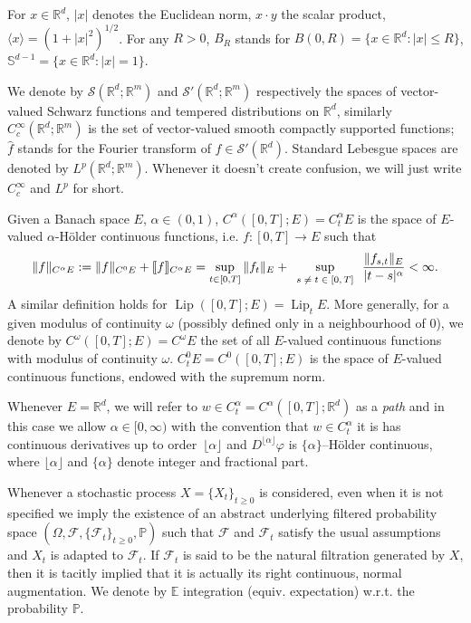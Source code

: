 \documentclass[10pt]{article}
\newcommand{\assign}{:=}
\newcommand{\tmem}[1]{{\em #1\/}}
\newcommand{\tmop}[1]{\ensuremath{\operatorname{#1}}}
\newcommand{\tmscript}[1]{\text{\scriptsize{$#1$}}}
\begin{document}
For $x \in \mathbb{R}^d$, $|x|$ denotes the Euclidean norm, $x \cdot y$ the
scalar product, $\langle x \rangle = (1 + |x|^2)^{1 / 2}$. For any $R > 0$,
$B_R$ stands for $B (0, R) = \{x \in \mathbb{R}^d : |x| \leqslant R\}$,
$\mathbb{S}^{d - 1} = \{x \in \mathbb{R}^d : |x| = 1\}$.

We denote by $\mathcal{S} (\mathbb{R}^d ; \mathbb{R}^m)$ and $\mathcal{S}'
(\mathbb{R}^d ; \mathbb{R}^m)$ respectively the spaces of vector-valued
Schwarz functions and tempered distributions on $\mathbb{R}^d$, similarly
$C^{\infty}_c  (\mathbb{R}^d ; \mathbb{R}^m)$ is the set of vector-valued
smooth compactly supported functions; $\hat{f}$ stands for the Fourier
transform of $f \in \mathcal{S}' (\mathbb{R}^d)$. Standard Lebesgue spaces are
denoted by $L^p  (\mathbb{R}^d ; \mathbb{R}^m)$. Whenever it doesn't create
confusion, we will just write $C^{\infty}_c$ and $L^p$ for short.

Given a Banach space $E$, $\alpha \in (0, 1)$, $C^{\alpha}  ([0, T] ; E) =
C^{\alpha}_t E$ is the space of $E$-valued $\alpha$-H{\"o}lder continuous
functions, i.e. $f : [0, T] \rightarrow E$ such that
\[ \|f\|_{C^{\alpha} E} \assign \|f\|_{C^0 E} + \llbracket f
   \rrbracket_{C^{\alpha} E} = \sup_{t \in [0, T]} \|f_t \|_E +
   \sup_{\tmscript{\begin{array}{c}
     s \neq t \in [0, T]
   \end{array}}}  \frac{\|f_{s, t} \|_E}{|t - s|^{\alpha}} < \infty . \]
A similar definition holds for $\tmop{Lip} ([0, T] ; E) = \tmop{Lip}_t E$.
More generally, for a given modulus of continuity $\omega$ (possibly defined
only in a neighbourhood of $0$), we denote by $C^{\omega}  ([0, T] ; E) =
C^{\omega} E$ the set of all $E$-valued continuous functions with modulus of
continuity $\omega$. $C^0_t E = C^0 ([0, T] ; E)$ is the space of $E$-valued
continuous functions, endowed with the supremum norm.

Whenever $E =\mathbb{R}^d$, we will refer to $w \in C^{\alpha}_t = C^{\alpha}
([0, T] ; \mathbb{R}^d)$ as a {\tmem{path}} and in this case we allow $\alpha
\in [0, \infty)$ with the convention that $w \in C_t^{\alpha}$ it is has
continuous derivatives up to order~$\lfloor \alpha \rfloor$ and $D^{\lfloor
\alpha \rfloor} \varphi$ is $\{\alpha\}$--H{\"o}lder continuous, where
$\lfloor \alpha \rfloor$ and $\{\alpha\}$ denote integer and fractional part.

Whenever a stochastic process $X = \{X_t \}_{t \geqslant 0}$ is considered,
even when it is not specified we imply the existence of an abstract underlying
filtered probability space $(\Omega, \mathcal{F}, \{\mathcal{F}_t \}_{t
\geqslant 0}, \mathbb{P})$ such that $\mathcal{F}$ and $\mathcal{F}_t$ satisfy
the usual assumptions and $X_t$ is adapted to $\mathcal{F}_t$. If
$\mathcal{F}_t$ is said to be the natural filtration generated by $X$, then it
is tacitly implied that it is actually its right continuous, normal
augmentation. We denote by $\mathbb{E}$ integration (equiv. expectation)
w.r.t. the probability $\mathbb{P}$.
\end{document}
